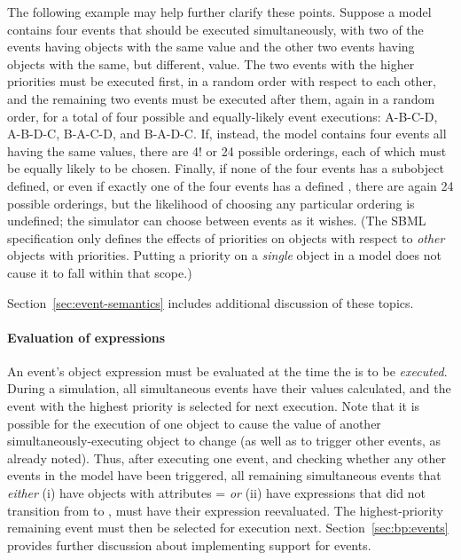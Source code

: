 The following example may help further clarify these points.
Suppose a model contains four events that should be executed
simultaneously, with two of the events having \Priority objects
with the same value and the other two events having \Priority
objects with the same, but different, value.  The two events with
the higher priorities must be executed first, in a random order
with respect to each other, and the remaining two events must be
executed after them, again in a random order, for a total of four
possible and equally-likely event executions: A-B-C-D, A-B-D-C,
B-A-C-D, and B-A-D-C.  If, instead, the model contains four events
all having the same \Priority values, there are 4! or 24
possible orderings, each of which must be equally likely to be
chosen.  Finally, if none of the four events has a \Priority
subobject defined, or even if exactly one of the four events has a
defined \Priority, there are again 24 possible orderings, but the
likelihood of choosing any particular ordering is undefined; the
simulator can choose between events as it wishes.  (The SBML
specification only defines the effects of priorities on \Event
objects with respect to \emph{other} \Event objects with
priorities.  Putting a priority on a \emph{single} \Event object
in a model does not cause it to fall within that scope.)

Section~\ref{sec:event-semantics} includes additional discussion
of these topics.


\paragraph{Evaluation of  expressions}

An event's \Priority object  expression must be
evaluated at the time the \Event is to be \emph{executed}.  During
a simulation, all simultaneous events have their \Priority values
calculated, and the event with the highest priority is selected for
next execution.  Note that it is possible for the execution of one
\Event object to cause the \Priority value of another
simultaneously-executing \Event object to change (as well as to
trigger other events, as already noted).  Thus, after executing
one event, and checking whether any other events in the model have
been triggered, all remaining simultaneous events that
\emph{either} (i) have \Trigger objects with attributes
= \emph{or} (ii) have \Trigger
expressions that did not transition from  to
, must have their \Priority expression reevaluated.
The highest-priority remaining event must then be selected for 
execution next.  Section~\ref{sec:bp:events} provides further
discussion about implementing support for events.


